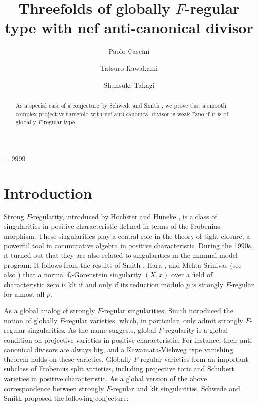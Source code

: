 \documentclass[12pt]{amsart}
\title{Threefolds of globally $F$-regular type with nef anti-canonical divisor}
\author{Paolo Cascini}
\author{Tatsuro Kawakami}
\author{Shunsuke Takagi}
\newcommand{\Q}{\mathbb{Q}}
\theoremstyle{plain}
\theoremstyle{definition}
\theoremstyle{remark}
\newtheorem{defn and notation}[thm]{Definition and Notation}
\theoremstyle{plain}
\begin{document}
\tolerance = 9999

\begin{abstract}
As a special case of a conjecture by Schwede and Smith \cite{SS10}, we prove that a smooth complex projective threefold with nef anti-canonical divisor is weak Fano if it is of globally $F$-regular type. 
\end{abstract}

\maketitle
{}


\section{Introduction}

Strong $F$-regularity, introduced by Hochster and Huneke \cite{HH89}, is a class of singularities in positive characteristic defined in terms of the Frobenius morphism. 
These singularities play a central role in the theory of tight closure, a powerful tool in commutative algebra in positive characteristic. 
During the 1990s, it turned out that they are also related to singularities in the minimal model program. 
It follows from the results of Smith \cite{Smith97}, Hara \cite{Hara98}, and Mehta-Srinivas \cite{Mehta-Srinivas97} (see also \cite{Hara-Watanabe}) that a normal $\Q$-Gorenstein singularity $(X,x)$ over a field of characteristic zero is klt if and only if its reduction modulo $p$ is strongly $F$-regular for almost all $p$. 

As a global analog of strongly $F$-regular singularities, Smith \cite{Smith00} introduced the notion of globally $F$-regular varieties, which, in particular,  only admit strongly $F$-regular singularities. 
As the name suggests, global $F$-regularity is a global condition on projective varieties in positive characteristic. 
For instance, their anti-canonical divisors are always big, and a Kawamata-Viehweg type vanishing theorem holds on these varieties. 
Globally $F$-regular varieties form an important subclass of Frobenius split varieties,  
including projective toric and Schubert varieties in positive characteristic. 
As a global version of the above correspondence between strongly $F$-regular and klt singularities, Schwede and Smith \cite{SS10} proposed the following conjecture: 
 
\end{document}
